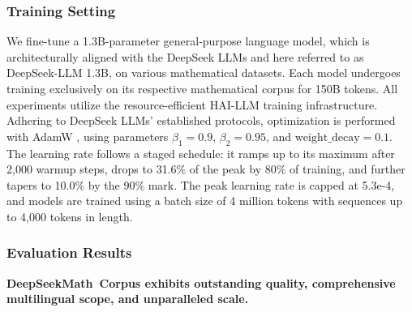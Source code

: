 \subsubsection{Training Setting}
\label{sec:quality-policy}
We fine-tune a 1.3B-parameter general-purpose language model, which is architecturally aligned with the DeepSeek LLMs \citep{deepseek-llm} and here referred to as DeepSeek-LLM 1.3B, on various mathematical datasets. Each model undergoes training exclusively on its respective mathematical corpus for 150B tokens. All experiments utilize the resource-efficient HAI-LLM \citep{haillm} training infrastructure. Adhering to DeepSeek LLMs’ established protocols, optimization is performed with AdamW \citep{adamW}, using parameters $\beta_1=0.9$, $\beta_2=0.95$, and $\mathrm{weight\_decay}=0.1$. The learning rate follows a staged schedule: it ramps up to its maximum after 2,000 warmup steps, drops to 31.6\% of the peak by 80\% of training, and further tapers to 10.0\% by the 90\% mark. The peak learning rate is capped at 5.3e-4, and models are trained using a batch size of 4 million tokens with sequences up to 4,000 tokens in length.

\subsubsection{Evaluation Results}

\textbf{DeepSeekMath~Corpus exhibits outstanding quality, comprehensive multilingual scope, and unparalleled scale.}

